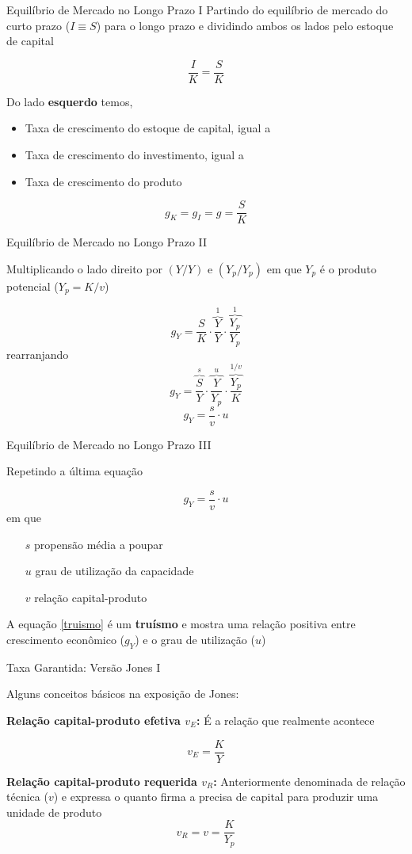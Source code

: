 \documentclass[10pt]{beamer}
\begin{document}
\begin{frame}{Equilíbrio de Mercado no Longo Prazo I}
Partindo do equilíbrio de mercado do curto prazo ($I \equiv S$) para o longo prazo e dividindo ambos os lados pelo estoque de capital

\begin{equation}
\frac{I}{K} = \frac{S}{K}
\end{equation}

Do lado \textbf{esquerdo} temos,
\begin{itemize}
	\item Taxa de crescimento do estoque de capital, igual a
	\item Taxa de crescimento do investimento, igual a 
	\item Taxa de crescimento do produto
\end{itemize}

$$
g_K = g_I = g = \frac{S}{K}
$$
\end{frame}

\begin{frame}{Equilíbrio de Mercado no Longo Prazo II}

Multiplicando o lado direito por $(Y/Y)$ e $(Y_p/Y_p)$ em que $Y_p$ é o produto potencial ($Y_p = K/v$)

$$
g_Y = \frac{S}{K}\cdot\overbrace{\frac{Y}{Y}}^{1}\cdot\overbrace{\frac{Y_p}{Y_p}}^{1}
$$
rearranjando
$$
g_Y = \overbrace{\frac{S}{Y}}^{s}\cdot\overbrace{\frac{Y}{Y_p}}^{u}\cdot\overbrace{\frac{Y_p}{K}}^{1/v}
$$
$$
g_Y = \frac{s}{v}\cdot u
$$	
\end{frame}

\begin{frame}{Equilíbrio de Mercado no Longo Prazo III}

Repetindo a última equação

\begin{equation}
\label{truismo}
g_Y = \frac{s}{v}\cdot u
\end{equation}
em que
\begin{itemize}
	\item[$s$] propensão média a poupar
	\item[$u$] grau de utilização da capacidade
	\item[$v$] relação capital-produto
\end{itemize}
A equação \ref{truismo} é um \textbf{truísmo} e mostra uma relação positiva entre crescimento econômico ($g_Y$) e o grau de utilização ($u$)
\end{frame}

\begin{frame}{Taxa Garantida: Versão Jones I}
	
Alguns conceitos básicos na exposição de Jones:


\textbf{Relação capital-produto efetiva $v_E$:} É a relação que realmente acontece
	
	$$
	v_E = \frac{K}{Y}
	$$
	
\textbf{Relação capital-produto requerida $v_R$:} Anteriormente denominada de relação técnica ($v$) e expressa o quanto firma a precisa de capital para produzir uma unidade de produto
	$$
	v_R = v = \frac{K}{Y_p}
	$$
\end{frame}
\end{document}
